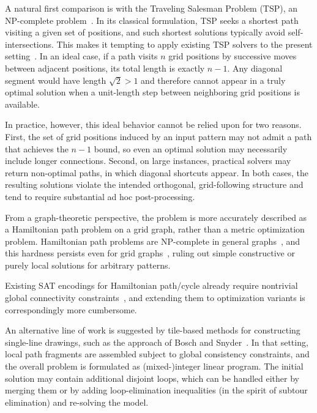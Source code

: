 \documentclass[letterpaper,11pt]{article}
\begin{document}
A natural first comparison is with the Traveling Salesman Problem
(TSP), an NP-complete problem~\cite{Papadimitriou1977EuclidTSP}. In
its classical formulation, TSP seeks a shortest path visiting a given
set of positions, and such shortest solutions typically avoid
self-intersections. This makes it tempting to apply existing TSP
solvers to the present setting~\cite{Cook2012InPursuit}. In an ideal
case, if a path visits \(n\) grid positions by successive moves
between adjacent positions, its total length is exactly \(n-1\). Any
diagonal segment would have length \(\sqrt{2}>1\) and therefore cannot
appear in a truly optimal solution when a unit-length step between
neighboring grid positions is available.

In practice, however, this ideal behavior cannot be relied upon for
two reasons. First, the set of grid positions induced by an input
pattern may not admit a path that achieves the \(n-1\) bound, so even
an optimal solution may necessarily include longer
connections. Second, on large instances, practical solvers may return
non-optimal paths, in which diagonal shortcuts appear. In both cases,
the resulting solutions violate the intended orthogonal,
grid-following structure and tend to require substantial ad hoc
post-processing.

From a graph-theoretic perspective, the problem is more accurately
described as a Hamiltonian path problem on a grid graph, rather than a
metric optimization problem. Hamiltonian path problems are NP-complete
in general graphs~\cite{GareyJohnson1979}, and this hardness persists
even for grid graphs~\cite{hamiltonGrid}, ruling out simple
constructive or purely local solutions for arbitrary patterns.

Existing SAT encodings for Hamiltonian path/cycle already require
nontrivial global connectivity
constraints~\cite{Zhou2019EfficientSAT}, and extending them to
optimization variants is correspondingly more cumbersome.

An alternative line of work is suggested by tile-based methods for
constructing single-line drawings, such as the approach of Bosch and
Snyder~\cite{BoschSnyder2023TileBasedSingleLine}. In that setting,
local path fragments are assembled subject to global consistency
constraints, and the overall problem is formulated as (mixed-)integer
linear program. The initial solution may contain additional disjoint
loops, which can be handled either by merging them or by adding
loop-elimination inequalities (in the spirit of subtour elimination)
and re-solving the model.
\end{document}
